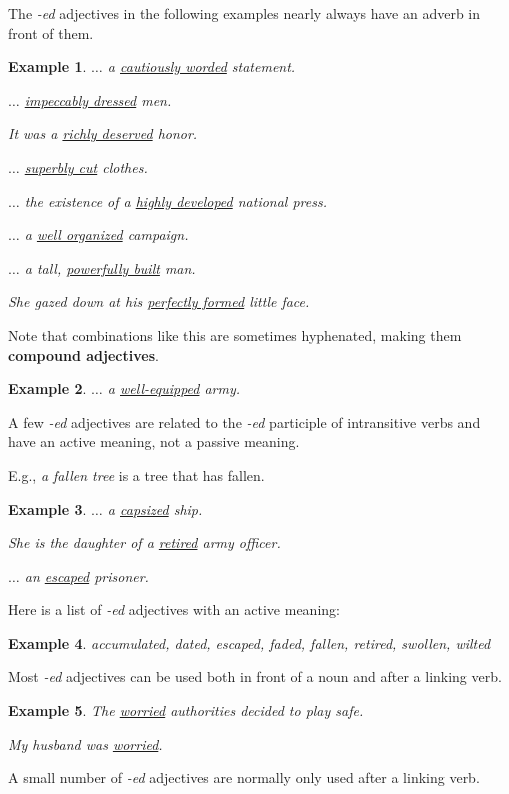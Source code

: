 \documentclass[oneside]{book}
\numberwithin{equation}{section}
\newtheorem{example}{Example}[section]
\begin{document}
The \textit{-ed} adjectives in the following examples nearly always have an adverb in front of them.
\begin{example}
    $\ldots$ a \underline{cautiously worded} statement.
    
    $\ldots$ \underline{impeccably dressed} men.
    
    It was a \underline{richly deserved} honor.
    
    $\ldots$ \underline{superbly cut} clothes.
    
    $\ldots$ the existence of a \underline{highly developed} national press.
    
    $\ldots$ a \underline{well organized} campaign.
    
    $\ldots$ a tall, \underline{powerfully built} man.
    
    She gazed down at his \underline{perfectly formed} little face.
\end{example}
Note that combinations like this are sometimes hyphenated, making them \textbf{compound adjectives}.
\begin{example}
    $\ldots$ a \underline{well-equipped} army.
\end{example}
%
\noindent{} A few \textit{-ed} adjectives are related to the \textit{-ed} participle of intransitive verbs and have an active meaning, not a passive meaning.

E.g., \textit{a fallen tree} is a tree that has fallen.
\begin{example}
    $\ldots$ a \underline{capsized} ship.
    
    She is the daughter of a \underline{retired} army officer.
    
    $\ldots$ an \underline{escaped} prisoner.
\end{example}
Here is a list of \textit{-ed} adjectives with an active meaning:
\begin{example}
    accumulated, dated, escaped, faded, fallen, retired, swollen, wilted
\end{example}
%
\noindent{} Most \textit{-ed} adjectives can be used both in front of a noun and after a linking verb.
\begin{example}
    The \underline{worried} authorities decided to play safe.
    
    My husband was \underline{worried}.
\end{example}
A small number of \textit{-ed} adjectives are normally only used after a linking verb.
\end{document}
